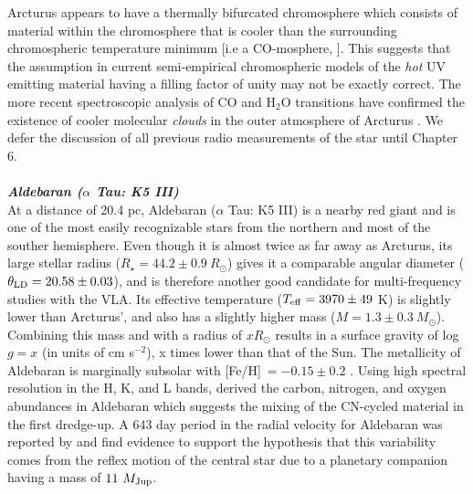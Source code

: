 Arcturus appears to have a thermally bifurcated chromosphere which consists of material within the chromosphere that is cooler than the surrounding chromospheric temperature minimum [i.e a CO-mosphere, \cite{wiedemann_1994}]. This suggests that the assumption in current semi-empirical chromospheric models of the \textit{hot} UV emitting material having a filling factor of unity may not be exactly correct. The more recent spectroscopic analysis of CO and H$_{2}$O transitions have confirmed the existence of cooler molecular \textit{clouds} in the outer atmosphere of Arcturus \citep{ryde_2002,tsuji_2009}. We defer the discussion of all previous radio measurements of the star until Chapter 6.
\\
\\
\textbf{\textit{Aldebaran ($\alpha$ Tau: K5 III)}}\\
At a distance of 20.4 pc, Aldebaran ($\alpha$ Tau: K5 III) is a nearby red giant and is one of the most easily recognizable stars from the northern and most of the souther hemisphere. Even though it is almost twice as far away as Arcturus, its large stellar radius ($R_{\star}=44.2 \pm 0.9 \ R_{\odot}$) gives it a comparable angular diameter ($\theta _{\rm{LD}}=20.58\pm0.03$), and is therefore another good candidate for multi-frequency studies with the VLA. Its effective temperature ($T_{\rm{eff}}=3970 \pm 49$ K) is slightly lower than Arcturus', and also has a slightly higher mass ($M=1.3 \pm 0.3 \ M_{\odot}$). Combining this mass and with a radius of $x R_{\odot}$  results in a surface gravity of log $g= x$ (in units of cm s$^{-2}$), x times lower than that of the Sun. The metallicity of Aldebaran is marginally subsolar with [Fe/H]$\ = - 0.15 \pm 0.2$ \citep{decin_2003}. Using high spectral resolution in the H, K, and L bands, \cite{tsuji_2008} derived the carbon, nitrogen, and oxygen abundances in Aldebaran which suggests the mixing of the CN-cycled material in the first dredge-up. A 643 day period in the radial velocity for Aldebaran was reported by \cite{hatzes_1993} and \cite{hatzes_1998} find evidence to support the hypothesis that this variability comes from the reflex motion of the central star due to a planetary companion having a mass of $11 \ M_{\rm{Jup}}$.

